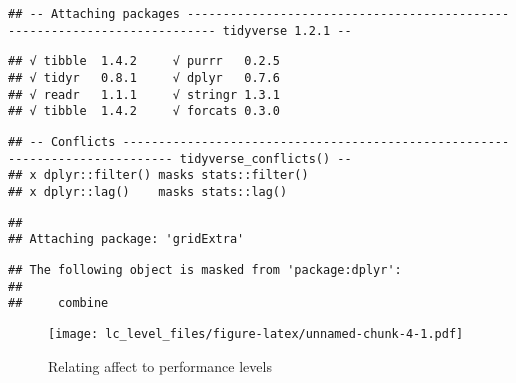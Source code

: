 \documentclass[]{article}
\begin{document}
\begin{verbatim}
## -- Attaching packages -------------------------------------------------------------------------- tidyverse 1.2.1 --
\end{verbatim}

\begin{verbatim}
## √ tibble  1.4.2     √ purrr   0.2.5
## √ tidyr   0.8.1     √ dplyr   0.7.6
## √ readr   1.1.1     √ stringr 1.3.1
## √ tibble  1.4.2     √ forcats 0.3.0
\end{verbatim}

\begin{verbatim}
## -- Conflicts ----------------------------------------------------------------------------- tidyverse_conflicts() --
## x dplyr::filter() masks stats::filter()
## x dplyr::lag()    masks stats::lag()
\end{verbatim}

\begin{verbatim}
## 
## Attaching package: 'gridExtra'
\end{verbatim}

\begin{verbatim}
## The following object is masked from 'package:dplyr':
## 
##     combine
\end{verbatim}

\begin{figure}
\centering
\texttt{[image: lc\_level\_files/figure-latex/unnamed-chunk-4-1.pdf]}
\caption{Relating affect to performance levels\label{level_relation}}
\end{figure}
\end{document}
